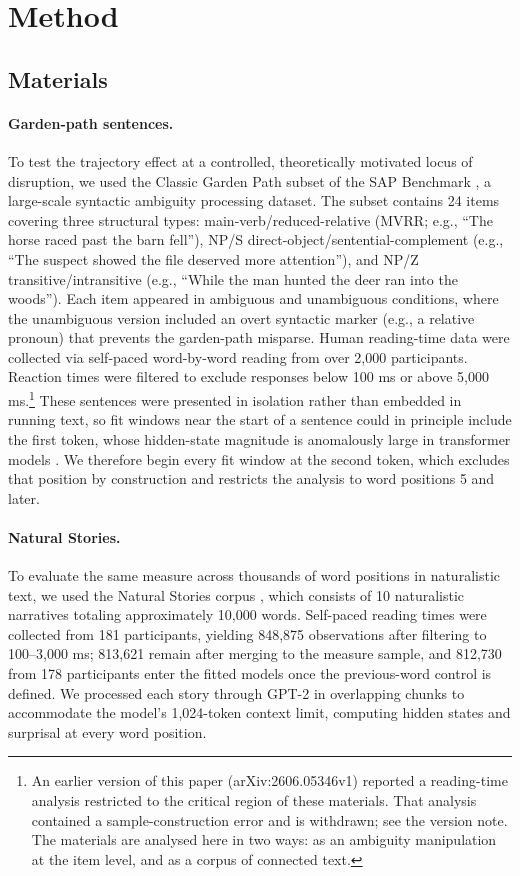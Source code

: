 \documentclass[12pt]{article}
\newcommand{\new}[1]{#1}   %
\begin{document}
\section{Method}

\subsection{Materials}

\paragraph{Garden-path sentences.} To test the trajectory effect at a controlled, theoretically motivated locus of disruption, we used the Classic Garden Path subset of the SAP Benchmark \citep{huang2024}, a large-scale syntactic ambiguity processing dataset. The subset contains 24 items covering three structural types: main-verb/reduced-relative (MVRR; e.g., ``The horse raced past the barn fell''), NP/S direct-object/sentential-complement (e.g., ``The suspect showed the file deserved more attention''), and NP/Z transitive/intransitive (e.g., ``While the man hunted the deer ran into the woods''). Each item appeared in ambiguous and unambiguous conditions, where the unambiguous version included an overt syntactic marker (e.g., a relative pronoun) that prevents the garden-path misparse. Human reading-time data were collected via self-paced word-by-word reading from over 2,000 participants. Reaction times were filtered to exclude responses below 100 ms or above 5,000 ms.\new{\footnote{An earlier version of this paper (arXiv:2606.05346v1) reported a reading-time analysis restricted to the critical region of these materials. That analysis contained a sample-construction error and is withdrawn; see the version note. The materials are analysed here in two ways: as an ambiguity manipulation at the item level, and as a corpus of connected text.}} \new{These sentences were presented in isolation rather than embedded in running text, so fit windows near the start of a sentence could in principle include the first token, whose hidden-state magnitude is anomalously large in transformer models \citep{xiao2023}. We therefore begin every fit window at the second token, which excludes that position by construction and restricts the analysis to word positions 5 and later.}

\paragraph{Natural Stories.} To evaluate the same measure across thousands of word positions in naturalistic text, we used the Natural Stories corpus \citep{futrell2018}, which consists of 10 naturalistic narratives totaling approximately 10,000 words. Self-paced reading times were collected from 181 participants, yielding \new{848,875} observations after filtering to 100--3,000 ms\new{; 813,621 remain after merging to the measure sample, and 812,730 from 178 participants enter the fitted models once the previous-word control is defined}. We processed each story through GPT-2 in overlapping chunks to accommodate the model's 1,024-token context limit, computing hidden states and surprisal at every word position.
\end{document}

